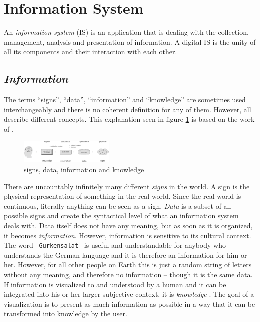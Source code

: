 

\section{Information System} %
\label{sub:information_system}

An \emph{information system} (IS) is an application that is dealing with the collection, management, analysis and presentation of information. A digital IS is the unity of all its components and their interaction with each other.

\subsection{\emph{Information}} %
\label{ssub:definition_of_information}
The terms ``signs'', ``data'', ``information'' and ``knowledge'' are sometimes used interchangeably and there is no coherent definition for any of them. However, all describe different concepts. This explanation seen in figure \ref{fig:information} is based on the work of \cite{datinfwis}.

\begin{figure}[ht]
    \begin{center}
        \includegraphics[width=0.4\textwidth]{graphics/basics/information}
    \end{center}
    \caption{signs, data, information and knowledge}
    \label{fig:information}
\end{figure}

There are uncountably infinitely many different \emph{signs} in the world. A sign is the physical representation of something in the real world. Since the real world is continuous, literally anything can be seen as a sign. \emph{Data} is a subset of all possible signs and create the syntactical level of what an information system deals with. Data itself does not have any meaning, but as soon as it is organized, it becomes \emph{information}. However, information is sensitive to its cultural context. The word ~\texttt{Gurkensalat}~ is useful and understandable for anybody who understands the German language and it is therefore an information for him or her. However, for all other people on Earth this is just a random string of letters without any meaning, and therefore no information -- though it is the same data. If information is visualized to and understood by a human and it can be integrated into his or her larger subjective context, it is \emph{knowledge} \cite{nake}. The goal of a visualization is to present as much information as possible in a way that it can be transformed into knowledge by the user.


